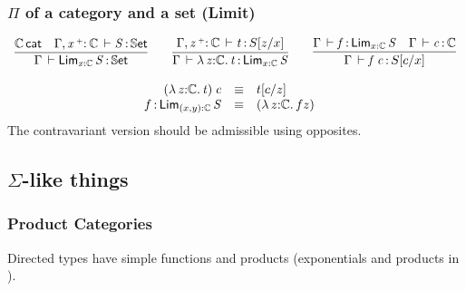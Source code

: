 \documentclass[11pt]{article}
\theoremstyle{plain}
\begin{document}
%

\subsubsection{$\Pi$ of a category and a set (Limit)}
\[
\begin{array}{c}
\infer{\ofdtp{\Gamma}{\picat{x}{\C}{S}}{\types}}
      {\wfdtp{\C} &
        \ofdtp{\Gamma,\catvar{x}{\co}{\C}}{S}{\types}}
\qquad
\infer{\oftp{\Gamma}{\lam{z}{\C}{t}}{\picat {x} \C S}}
      {\oftp{\Gamma,\catvar{z}{\co}{\C}}{t}{\tsubst{S}{z/x}}}
\qquad
\infer{\oftp{\Gamma}{\app f {c}}{\tsubst S {c/x}}}
      {\oftp{\Gamma}{f}{\picat{x}{\C}{S}} &
        \ofdtp{\Gamma}{c}{\C}}
\end{array}
\]

\[
\begin{array}{rcll}
\mathit{({\lambda\,z \mathit{:} \mathbb{C}.\,t}) \: c} & \equiv & t [ c / z ] \\
f \, \mathit{:} \, \textnormal{\ensuremath{\mathsf{Lim}}}_{(x,y) \mathit{:} \mathbb{C}} \,\mathit{S} & \equiv & {({\lambda\,z \mathit{:} \mathbb{C}.\,f}{z})} &
\end{array} \\
\]
The contravariant version should be admissible using opposites.

\subsection{$\Sigma$-like things}

\subsubsection{Product Categories}
Directed types have simple functions and products (exponentials and
products in \Cat).
\end{document}
